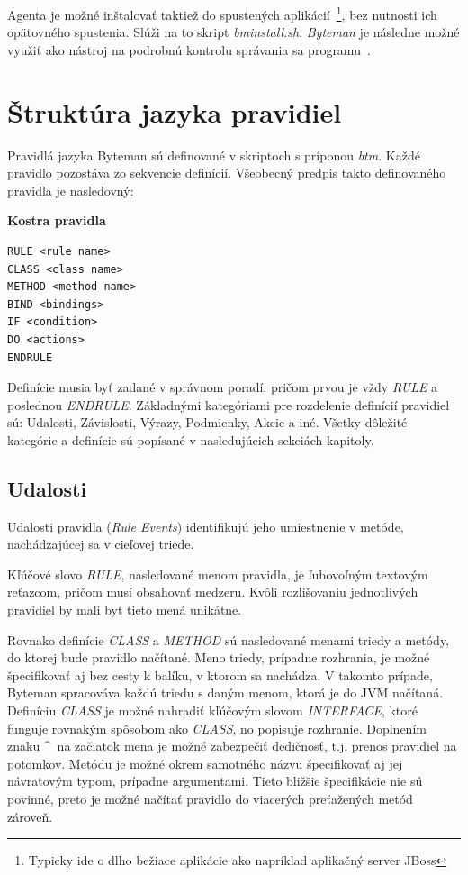 \documentclass[11pt,final,oneside]{fithesis}
\newenvironment{example}[1]
{
\vspace{3mm}
\noindent\textbf{#1}
\vspace{2mm}
}
{
\vspace{3mm}
}
\begin{document}
Agenta je možné inštalovať taktiež do spustených aplikácií~\footnote{Typicky
ide o dlho bežiace aplikácie ako napríklad aplikačný server JBoss}, bez 
nutnosti ich opätovného spustenia. Slúži na to skript \textit{bminstall.sh}.
\textit{Byteman} je následne možné využiť ako nástroj na podrobnú kontrolu 
správania sa 
programu~\cite{RedHat:Byteman}. 

\section{Štruktúra jazyka pravidiel}
Pravidlá jazyka Byteman sú definované v skriptoch s príponou \textit{btm}.
Každé pravidlo pozostáva zo sekvencie definícií. Všeobecný predpis takto
definovaného pravidla je nasledovný:

\begin{example}{Kostra pravidla}
\begin{verbatim}
RULE <rule name>
CLASS <class name>
METHOD <method name>
BIND <bindings>
IF <condition>
DO <actions>
ENDRULE
\end{verbatim}
\end{example}

Definície musia byť zadané v správnom poradí, pričom prvou je vždy
\textit{RULE} a poslednou \textit{ENDRULE}. Základnými kategóriami pre
rozdelenie definícií pravidiel sú: Udalosti, Závislosti, Výrazy, Podmienky,
Akcie a iné. Všetky dôležité kategórie a definície sú popísané v nasledujúcich
sekciách kapitoly.

\subsection{Udalosti}
Udalosti pravidla (\textit{Rule Events}) identifikujú jeho umiestnenie v
metóde, nachádzajúcej sa v cieľovej triede.

Kľúčové slovo \textit{RULE}, nasledované menom pravidla, je ľubovoľným 
textovým reťazcom, pričom musí obsahovať medzeru. Kvôli rozlišovaniu 
jednotlivých pravidiel by mali byť tieto mená unikátne.

Rovnako definície \textit{CLASS} a \textit{METHOD} sú nasledované menami 
triedy a metódy, do ktorej bude pravidlo načítané. Meno triedy, prípadne 
rozhrania,
je možné špecifikovať aj bez cesty k balíku, v ktorom sa nachádza. V 
takomto prípade, Byteman spracováva každú triedu s daným menom, ktorá je do 
JVM načítaná. Definíciu \textit{CLASS} je možné nahradiť kľúčovým slovom
\textit{INTERFACE}, ktoré funguje rovnakým spôsobom ako \textit{CLASS}, no 
popisuje rozhranie. Doplnením znaku \^~na začiatok mena je možné zabezpečiť 
dedičnosť, t.j. prenos pravidiel na potomkov.
Metódu je možné okrem samotného názvu špecifikovať aj jej návratovým typom, 
prípadne argumentami. Tieto bližšie špecifikácie nie sú povinné, preto je 
možné načítať pravidlo do viacerých preťažených metód zároveň.
\end{document}
